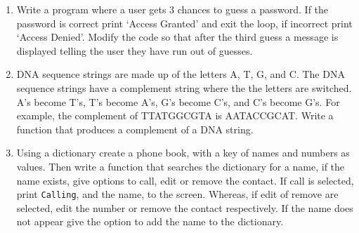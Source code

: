 \begin{enumerate}

\item Write a program where a user gets 3 chances to guess a password. If the password is correct print `Access Granted' and exit the loop, if incorrect print `Access Denied'. Modify the code so that after the third guess a message is displayed telling the user they have run out of guesses.
\item DNA sequence strings are made up of the letters A, T, G, and C. The DNA sequence strings have a complement string where the the letters are switched. A's become T's,
T's become A's, G's become C's, and C's become G's. For example, the complement
of TTATGGCGTA is AATACCGCAT. Write a function that produces a complement of a DNA string.
\item Using a dictionary create a phone book, with a key of names and numbers as values. Then write a function that searches the dictionary for a name, if the name exists, give options to call, edit or remove the contact. If call is selected, print \texttt{Calling}, and the name, to the screen. Whereas, if edit of remove are selected, edit the number or remove the contact respectively. If the name does not appear give the option to add the name to the dictionary. 

\end{enumerate}

\newpage
